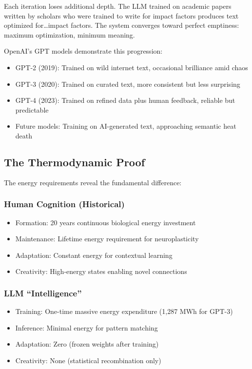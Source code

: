 Each iteration loses additional depth. The LLM trained on academic papers written by scholars who were trained to write for impact factors produces text optimized for\ldots impact factors. The system converges toward perfect emptiness: maximum optimization, minimum meaning.

OpenAI's GPT models demonstrate this progression:
\begin{itemize}
\item GPT-2 (2019): Trained on wild internet text, occasional brilliance amid chaos
\item GPT-3 (2020): Trained on curated text, more consistent but less surprising
\item GPT-4 (2023): Trained on refined data plus human feedback, reliable but predictable
\item Future models: Training on AI-generated text, approaching semantic heat death
\end{itemize}

\subsection{The Thermodynamic Proof}

The energy requirements reveal the fundamental difference:

\subsubsection{Human Cognition (Historical)}
\begin{itemize}
\item Formation: 20 years continuous biological energy investment
\item Maintenance: Lifetime energy requirement for neuroplasticity
\item Adaptation: Constant energy for contextual learning
\item Creativity: High-energy states enabling novel connections
\end{itemize}

\subsubsection{LLM ``Intelligence''}
\begin{itemize}
\item Training: One-time massive energy expenditure (1,287 MWh for GPT-3)
\item Inference: Minimal energy for pattern matching
\item Adaptation: Zero (frozen weights after training)
\item Creativity: None (statistical recombination only)
\end{itemize}

